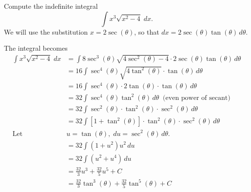 \documentclass{ximera}
\begin{document}
\begin{example}[example 5]
Compute the indefinite integral
\[
\int x^3\sqrt{x^2-4} \; dx.
\]
We will use the substitution $x = 2\sec(\theta)$,
so that $dx = 2\sec(\theta)\tan(\theta) \, d\theta$.

The integral becomes
\begin{align*}
\int x^3\sqrt{x^2-4}\; dx &= \int 8\sec^3(\theta)\sqrt{4\sec^2(\theta)-4}\cdot 2\sec(\theta)\tan(\theta)\, d\theta\\[6pt]
                           &=  16\int \sec^4(\theta)\sqrt{4\tan^2(\theta)}\cdot \tan(\theta)\, d\theta\\[6pt]   
                            &=  16\int \sec^4(\theta)\cdot2\tan(\theta)\cdot \tan(\theta)\, d\theta\\[6pt] 
                            &=  32\int \sec^4(\theta)\tan^2(\theta)\, d\theta \;\; \text{(even power of secant)} \\[6pt]
                            &=  32\int  \sec^2(\theta) \cdot \tan^2(\theta)\cdot\sec^2(\theta)\, d\theta\\[6pt]  
                            &=  32\int  [1 + \tan^2(\theta)] \cdot \tan^2(\theta)\cdot\sec^2(\theta)\, d\theta\\[6pt]  
                            \text{Let } \; & u = \tan(\theta), \; du = \sec^2(\theta) \, d\theta.\\[6pt]
                            &=  32\int \left(1 + u^2\right)u^2\, du\\[6pt] 
                             &=  32\int \left(u^2 + u^4\right) \, du\\[6pt]
                             &= \frac{32}{3} u^3 + \frac{32}{5} u^5 + C\\[6pt]
                             &= \frac{32}{3} \tan^3(\theta) + \frac{32}{5} \tan^5(\theta) + C                            
\end{align*}




\begin{image}
\end{image}





\end{example}
\end{document}
